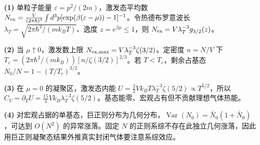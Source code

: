 \par\noindent\textbf{(1)} 单粒子能量 \(\varepsilon=p^2/(2m)\)，激发态平均数 \(N_{\rm ex}=\frac{V}{(2\pi\hbar)^3}\int d^3p[\exp(\beta(\varepsilon-\mu))-1]^{-1}\)。令热德布罗意波长 \(\lambda_T=\sqrt{2\pi\hbar^2/(mk_BT)}\)、逸度 \(z=e^{\beta\mu}\le1\)，则 \(N_{\rm ex}=V\lambda_T^{-3}g_{3/2}(z)\)。
\par\noindent\textbf{(2)} 当 \(\mu\uparrow0\)，激发数上限 \(N_{\rm ex,max}=V\lambda_T^{-3}\zeta(3/2)\)。定密度 \(n=N/V\) 下 \(T_c=(2\pi\hbar^2/(mk_B))[n/\zeta(3/2)]^{2/3}\)。若 \(T<T_c\)，剩余占基态 \(N_0/N=1-(T/T_c)^{3/2}\)。
\par\noindent\textbf{(3)} 在 \(\mu=0\) 的凝聚区，激发态内能 \(U=\tfrac32 Vk_BT\lambda_T^{-3}\zeta(5/2)\propto T^{5/2}\)，所以 \(C_V=\partial_TU=\tfrac{15}{4}Vk_B\lambda_T^{-3}\zeta(5/2)\)。基态能零、宏观占有但不贡献理想气体热能。
\par\noindent\textbf{(4)} 对宏观占据的单基态，巨正则分布为几何分布，\(\operatorname{Var}(N_0)=\bar N_0(1+\bar N_0)\)，可达到 \(O(N^2)\) 的异常涨落。固定 \(N\) 的正则系综不存在此独立几何涨落，因此用巨正则凝聚态结果外推真实封闭气体要注意系综效应。
